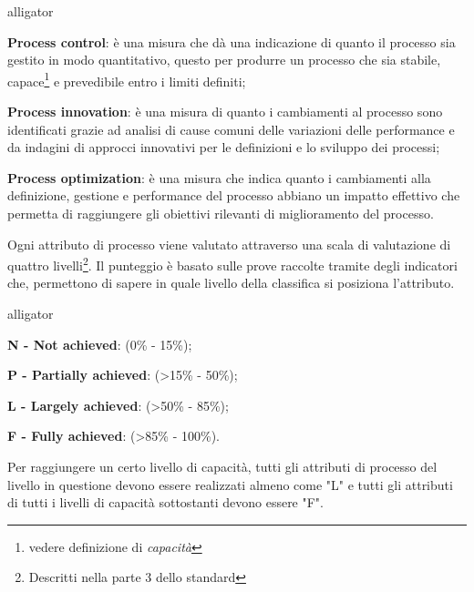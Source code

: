 \begin{labeling}{alligator}
	\item \textbf{Process control}:  è una misura che dà una indicazione di quanto il processo sia gestito in modo quantitativo, questo per produrre un processo che sia stabile, capace\footnote{vedere definizione di \emph{capacità}} e prevedibile entro i limiti definiti;%
	\item \textbf{Process innovation}: è una misura di quanto i cambiamenti al processo sono identificati grazie ad analisi di cause comuni delle variazioni delle performance e da indagini di approcci innovativi per le definizioni e lo sviluppo dei processi;%
	\item \textbf{Process optimization}: è una misura che indica quanto i cambiamenti alla definizione, gestione e performance del processo abbiano un impatto effettivo che permetta di raggiungere gli obiettivi rilevanti di miglioramento del processo.%
\end{labeling}

Ogni attributo di processo viene valutato attraverso una scala di valutazione di quattro livelli\footnote{Descritti nella parte 3 dello standard}. Il punteggio è basato sulle prove raccolte tramite degli indicatori che, permettono di sapere in quale livello della classifica si posiziona l'attributo. 
\begin{labeling}{alligator}
	\item \textbf{N - Not achieved}: (0\% - 15\%);
	\item \textbf{P - Partially achieved}: (>15\% - 50\%);
	\item \textbf{L - Largely achieved}: (>50\% - 85\%);
	\item \textbf{F - Fully achieved}: (>85\% - 100\%).
\end{labeling}

Per raggiungere un certo livello di capacità, tutti gli attributi di processo del livello in questione devono essere realizzati almeno come "L" e tutti gli attributi di tutti i livelli di capacità sottostanti devono essere "F".

